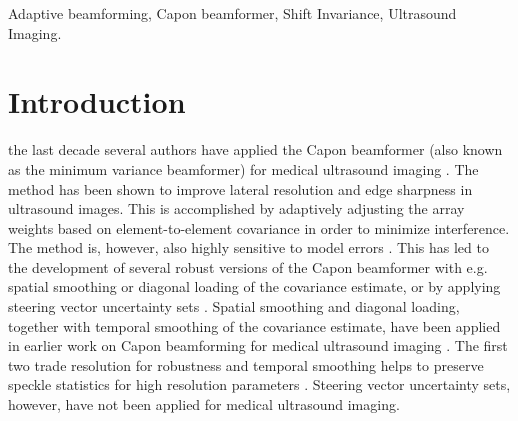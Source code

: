 \documentclass[draftcls]{IEEEtran}
\begin{document}
\begin{IEEEkeywords}
Adaptive beamforming, Capon beamformer, Shift Invariance, Ultrasound Imaging.
\end{IEEEkeywords}






%
\IEEEpeerreviewmaketitle



\section{Introduction}
% 
% 
% 
% 

 the last decade several authors have applied the Capon beamformer (also known as the minimum variance beamformer) for medical ultrasound imaging \cite{Synnevag2007, Vignon2008, Viola}. The method has been shown to improve lateral resolution and edge sharpness \cite{Synnevag2007, Synnevag2009, Chen2011} in ultrasound images. This is accomplished by adaptively adjusting the array weights based on element-to-element covariance in order to minimize interference. The method is, however, also highly sensitive to model errors \cite{Mestre2006, Widrow1982, Wax1996, Wax1996a}. This has led to the development of several robust versions of the Capon beamformer with e.g. spatial smoothing \cite{Shan1985} or diagonal loading \cite{JianLi2003} of the covariance estimate, or by applying steering vector uncertainty sets \cite{Lorenz2005, Rubsamen2013}. Spatial smoothing and diagonal loading, together with temporal smoothing of the covariance estimate, have been applied in earlier work on Capon beamforming for medical ultrasound imaging \cite{Synnevag2009}. The first two trade resolution for robustness and temporal smoothing helps to preserve speckle statistics for high resolution parameters \cite{Synnevag2007a}. Steering vector uncertainty sets, however, have not been applied for medical ultrasound imaging.
\end{document}
